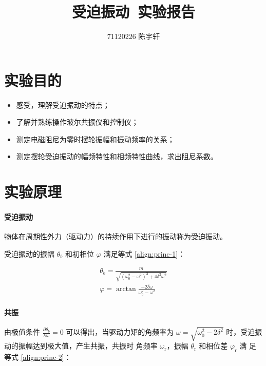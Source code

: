 \documentclass[12pt]{ctexart}
\author{71120226 陈宇轩}
\title{受迫振动\ 实验报告}
\begin{document}
    \maketitle

    \section{实验目的}

    \begin{itemize}
        \item 感受，理解受迫振动的特点；
        \item 了解并熟练操作玻尔共振仪和控制仪；
        \item 测定电磁阻尼为零时摆轮振幅和振动频率的关系；
        \item 测定摆轮受迫振动的幅频特性和相频特性曲线，求出阻尼系数。
    \end{itemize}

    \section{实验原理}

    \paragraph{受迫振动}

    物体在周期性外力（驱动力）的持续作用下进行的振动称为受迫振动。

    受迫振动的振幅 $\theta_b$ 和初相位 $\varphi$ 满足等式 \eqref{align:princ-1}：

    \begin{equation}
        \begin{gathered}
            \label{align:princ-1}
            \theta_b = \frac{m}{\sqrt{(\omega_0^2 - \omega^2)^3 + 4\delta^2\omega^2}} \\
            \varphi = \arctan \frac{-2\delta\omega}{\omega_0^2 - \omega^2}
        \end{gathered}
    \end{equation}
    
    \paragraph{共振}

    由极值条件 $\frac{\partial \theta_b}{\partial \omega} = 0$ 可以得出，当驱动力矩的角频率为
    $\omega = \sqrt{\omega_0^2 - 2 \delta^2}$ 时，受迫振动的振幅达到极大值，产生共振，共振时
    角频率 $\omega_\mathrm{r}$，振幅 $\theta_\mathrm{r}$ 和相位差 $\varphi_\mathrm{r}$ 满
    足等式 \eqref{align:princ-2}：
\end{document}

